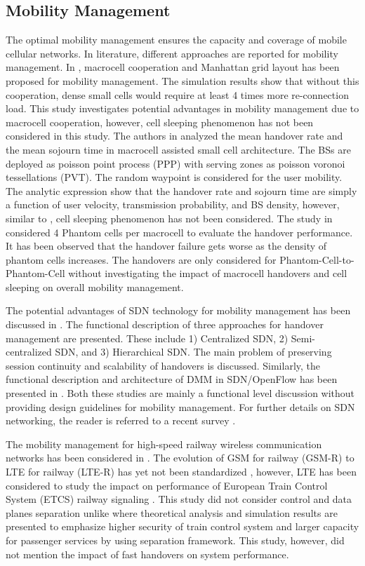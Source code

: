 \documentclass[article,10pt,twocolumn]{IEEEtran}
\begin{document}
\subsection{Mobility Management}\label{sec:mob_man}
The optimal mobility management ensures the capacity and coverage of mobile cellular networks. In literature, different approaches are reported for mobility management. In \citep{7022987}, macrocell cooperation and Manhattan grid layout has been proposed for mobility management. The simulation results show that without this cooperation, dense small cells would require at least 4 times more re-connection load. This study investigates potential advantages in mobility management due to macrocell cooperation, however, cell sleeping phenomenon has not been considered in this study. The authors in \citep{7059729} analyzed the mean handover rate and the mean sojourn time in macrocell assisted small cell architecture. The BSs are deployed as poisson point process (PPP) with serving zones as poisson voronoi tessellations (PVT). The random waypoint is considered for the user mobility. The analytic expression show that the handover rate and sojourn time are simply a function of user velocity, transmission probability, and BS density, however, similar to \citep{7022987}, cell sleeping phenomenon has not been considered. The study in \citep{6477646} considered 4 Phantom cells per macrocell to evaluate the handover performance. It has been observed that the handover failure gets worse as the density of phantom cells increases. The handovers are only considered for Phantom-Cell-to-Phantom-Cell without investigating the impact of macrocell handovers and cell sleeping on overall mobility management.

The potential advantages of SDN technology for mobility management has been discussed in \citep{7063430}. The functional description of three approaches for handover management are presented. These include 1) Centralized SDN, 2) Semi-centralized SDN, and 3) Hierarchical SDN. The main problem of preserving session continuity and scalability of handovers is discussed. Similarly, the functional description and architecture of DMM in SDN/OpenFlow has been presented in \citep{7063379}. Both these studies are mainly a functional level discussion without providing design guidelines for mobility management. For further details on SDN networking, the reader is referred to a recent survey \citep{6994333}.

The mobility management for high-speed railway wireless communication networks has been considered in \citep{6807723, 6710300}. The evolution of GSM for railway (GSM-R) to LTE for railway (LTE-R) has yet not been standardized \citep{choi_standards_2014}, however, LTE has been considered to study the impact on performance of European Train Control System (ETCS) railway signaling \citep{6807723}. This study did not consider control and data planes separation unlike \citep{6710300} where theoretical analysis and simulation results are presented to emphasize higher security of train control system and larger capacity for passenger services by using separation framework. This study, however, did not mention the impact of fast handovers on system performance.
\end{document}
